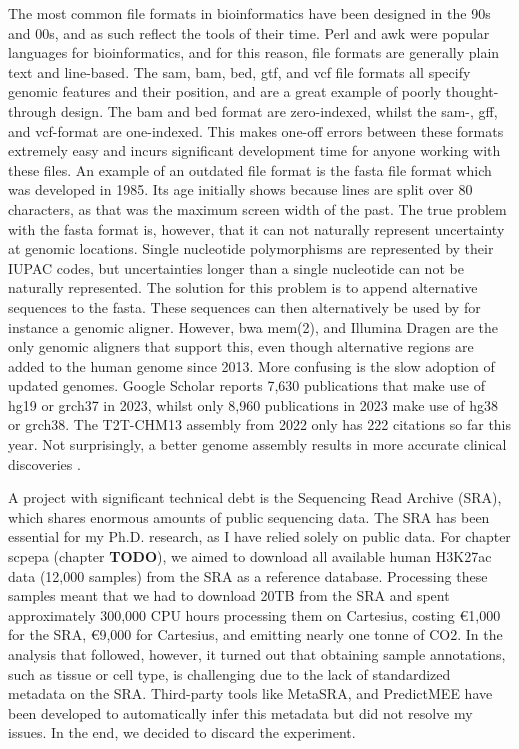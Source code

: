 The most common file formats in bioinformatics have been designed in the 90s and 00s, and as such reflect the tools of their time. Perl and awk were popular languages for bioinformatics, and for this reason, file formats are generally plain text and line-based. The sam, bam, bed, gtf, and vcf file formats all specify genomic features and their position, and are a great example of poorly thought-through design. The bam and bed format are zero-indexed\cite{Li2009}, whilst the sam-, gff, and vcf-format are one-indexed\cite{Li2009,Danecek2011}. This makes one-off errors between these formats extremely easy and incurs significant development time for anyone working with these files. An example of an outdated file format is the fasta file format which was developed in 1985\cite{Lipman1985}. Its age initially shows because lines are split over 80 characters, as that was the maximum screen width of the past. The true problem with the fasta format is, however, that it can not naturally represent uncertainty at genomic locations. Single nucleotide polymorphisms are represented by their IUPAC codes, but uncertainties longer than a single nucleotide can not be naturally represented. The solution for this problem is to append alternative sequences to the fasta. These sequences can then alternatively be used by for instance a genomic aligner. However, bwa mem(2)\cite{bwamem,bwamem2}, and Illumina Dragen are the only genomic aligners that support this, even though alternative regions are added to the human genome since 2013. More confusing is the slow adoption of updated genomes. Google Scholar reports 7,630 publications that make use of  hg19 or grch37 in 2023, whilst only 8,960 publications in 2023 make use of hg38 or grch38. The T2T-CHM13 assembly from 2022 only has 222 citations so far this year. Not surprisingly, a better genome assembly results in more accurate clinical discoveries \cite{Aganezov2022}.

A project with significant technical debt is the Sequencing Read Archive (SRA), which shares enormous amounts of public sequencing data. The SRA has been essential for my Ph.D. research, as I have relied solely on public data. For chapter scpepa (chapter \textbf{TODO}), we aimed to download all available human H3K27ac data (12,000 samples) from the SRA as a reference database. Processing these samples meant that we had to download 20TB from the SRA and spent approximately 300,000 CPU hours processing them on Cartesius, costing €1,000 for the SRA\cite{amazon}, €9,000 for Cartesius, and emitting nearly one tonne of CO2\cite{CO2}. In the analysis that followed, however, it turned out that obtaining sample annotations, such as tissue or cell type, is challenging due to the lack of standardized metadata on the SRA. Third-party tools like MetaSRA\cite{Bernstein2017}, and PredictMEE\cite{Klie2021} have been developed to automatically infer this metadata but did not resolve my issues. In the end, we decided to discard the experiment. 

